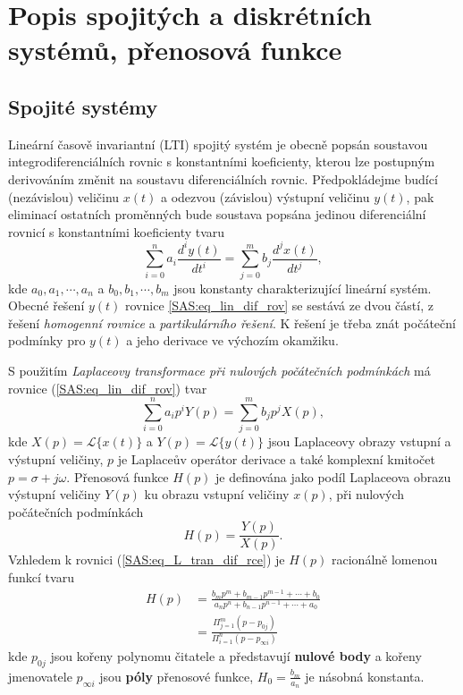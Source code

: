  \section{Popis spojitých a diskrétních systémů, přenosová funkce}\label{tky:IchIIsecIII}
    \subsection{Spojité systémy}
      Lineární časově invariantní (LTI) spojitý systém je obecně popsán soustavou
      integrodiferenciálních rovnic s konstantními koeficienty, kterou lze postupným derivováním
      změnit na soustavu diferenciálních rovnic. Předpokládej\-me budící (ne\-zá\-vis\-lou) veličinu
      $x(t)$ a odezvou (závislou) výstupní veličinu $y(t)$, pak eliminací ostatních proměnných bude 
      soustava popsána jedinou diferenciální rovnicí s konstantními koeficienty tvaru
      \begin{equation}\label{SAS:eq_lin_dif_rov}
          \sum_{i=0}^na_i\frac{d^iy(t)}{dt^i}=\sum_{j=0}^mb_j\frac{d^jx(t)}{dt^j},
      \end{equation}
      kde $a_0, a_1, \cdots ,a_n$ a $b_0, b_1, \cdots ,b_m$ jsou konstanty charakterizující lineární
      systém. Obecné řešení $y(t)$ rovnice \ref{SAS:eq_lin_dif_rov} se sestává ze dvou částí, z 
      řešení \emph{homogenní rovnice} a \emph{partikulárního řešení}. K řešení je třeba znát 
      počáteční podmínky pro $y(t)$ a jeho derivace ve výchozím okamžiku.
  
      S použitím \emph{Laplaceovy transformace při nulových počátečních podmínkách} má rovnice
      (\ref{SAS:eq_lin_dif_rov}) tvar
      \begin{equation}\label{SAS:eq_L_tran_dif_rce}
        \sum_{i=0}^na_ip^iY(p)=\sum_{j=0}^mb_jp^jX(p),
      \end{equation}
      kde $X(p)=\mathcal{L}\{x(t)\}$ a $Y(p)=\mathcal{L}\{y(t)\}$ jsou Laplaceovy obrazy vstupní a
      výstupní veličiny, $p$ je Laplaceův operátor derivace a také komplexní kmitočet 
      $p=\sigma+j\omega$. Přenosová funkce $H(p)$ je definována jako podíl Laplaceova obrazu 
      výstupní veličiny $Y(p)$ ku obrazu vstupní veličiny $x(p)$, při nulových počátečních 
      podmínkách
      \begin{equation}\label{SAS:eq_Hp_popis}
          H(p)=\frac{Y(p)}{X(p)}.
      \end{equation}
      Vzhledem k rovnici (\ref{SAS:eq_L_tran_dif_rce}) je $H(p)$ racionálně lomenou funkcí tvaru
      \begin{align}
        H(p)&=\frac{b_mp^m+b_{m-1}p^{m-1}+\cdots+b_0}{a_np^n+b_{n-1}p^{n-1}+\cdots+a_0}  \nonumber\\
            &=\frac{\Pi_{j=1}^m(p-p_{0j})}{\Pi_{i=1}^n(p-p_{\infty i})}            \label{tky:eq002}
      \end{align}
      kde $p_{0j}$ jsou kořeny polynomu čitatele a představují \textbf{nulové body} a kořeny
      jmenovatele $p_{\infty i}$ jsou \textbf{póly} přenosové funkce, $H_0=\frac{b_m}{a_n}$ je
      násobná konstanta.
  
